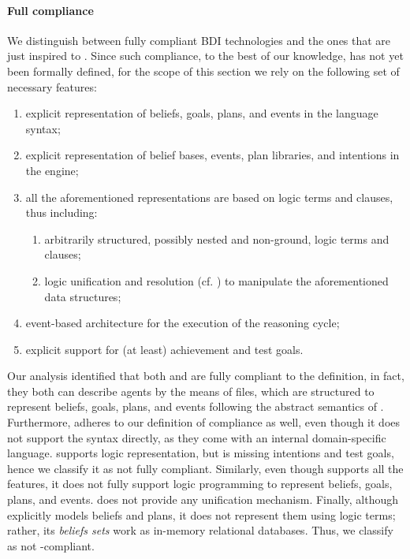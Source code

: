 

\paragraph{Full \agentspeak{} compliance}

We distinguish between fully compliant \ac{BDI} technologies 
and the ones that are just inspired to \agentspeak{}.
%
Since such compliance,
to the best of our knowledge,
has not yet been formally defined,
for the scope of this section we rely on the following set of necessary features:
%
\begin{enumerate}
    \item explicit representation of beliefs, goals, plans, and events in the language syntax;
    \item explicit representation of belief bases, events, plan libraries, and intentions in the engine;
    \item all the aforementioned representations are based on logic terms and clauses,
    thus including:
    \begin{enumerate}
        \item arbitrarily structured, possibly nested and non-ground, logic terms and clauses;
        \item logic unification and resolution (cf. \cite{KornerLBCDHMWDA22})
        to manipulate the aforementioned data structures;
    \end{enumerate}
    \item event-based architecture for the execution of the reasoning cycle;
    \item explicit support for (at least) achievement and test goals.
\end{enumerate}

Our analysis identified that both \jason{} and \spadebdi{} are fully compliant to the \agentspeak{} definition,
in fact, they both can describe agents by the means of  files,
which are structured to represent beliefs, goals, plans, and events following the abstract semantics of \agentspeak{}.
%
Furthermore, \phidias{} adheres to our definition of \agentspeak{} compliance as well,
even though it does not support the \agentspeak{} syntax directly,
as they come with an internal domain-specific language.
%
\goal{} supports logic representation,
but is missing intentions and test goals,
hence we classify it as not fully compliant.
%
Similarly, even though \astra{} supports all the \agentspeak{} features,
it does not fully support logic programming to represent beliefs, goals, plans, and events.
%
\jadex{} does not provide any unification mechanism.
%
Finally,
although \jack{} explicitly models beliefs and plans,
it does not represent them using logic terms;
rather, its \textit{beliefs sets} work as in-memory relational databases.
%
Thus, we classify \jack{} as not \agentspeak{}-compliant.

